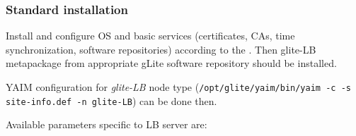 \subsubsection{Standard installation}

Install and configure OS and basic services (certificates, CAs, time synchronization, software repositories) according to the . Then glite-LB metapackage from appropriate gLite software repository should be installed.

YAIM configuration for \emph{glite-LB} node type 
(\texttt{/opt/glite/yaim/bin/yaim -c -s site-info.def -n glite-LB}) 
can be done then.

Available parameters specific to LB server are:

